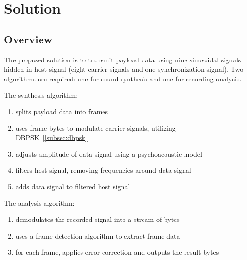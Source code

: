 \chapter{Solution}
\label{chap:solution}

\section{Overview}

The proposed solution is to transmit payload data using nine sinusoidal signals hidden in host signal (eight carrier signals and one synchronization signal). Two algorithms are required: one for sound synthesis and one for recording analysis.

The synthesis algorithm:
\begin{enumerate}
\item splits payload data into frames
\item uses frame bytes to modulate carrier signals, utilizing DBPSK~[\ref{subsec:dbpsk}]
\item adjusts amplitude of data signal using a psychoacoustic model
\item filters host signal, removing frequencies around data signal
\item adds data signal to filtered host signal
\end{enumerate}

The analysis algorithm:
\begin{enumerate}
\item demodulates the recorded signal into a stream of bytes
\item uses a frame detection algorithm to extract frame data
\item for each frame, applies error correction and outputs the result bytes
\end{enumerate}

